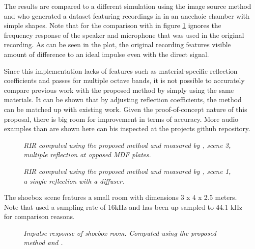 \documentclass[twoside,a4paper]{article}
\begin{document}
The results are compared to a different simulation using the image source method \cite{lehmann_fast_2020} and \cite{brinkmann_round_2019} who generated a dataset featuring recordings in in an anechoic chamber with simple shapes. Note that for the comparison with \cite{brinkmann_round_2019} in figure \ref{fig:multRefl} ignores the frequency response of the speaker and microphone that was used in the original recording. As can be seen in the plot, the original recording features visible amount of difference to an ideal impulse even with the direct signal. 

Since this implementation lacks of features such as material-specific reflection coefficients and passes for multiple octave bands, it is not possible to accurately compare previous work with the proposed method by simply using the same materials. It can be shown that by adjusting reflection coefficients, the method can be matched up with existing work.
Given the proof-of-concept nature of this proposal, there is big room for improvement in terms of accuracy. More audio examples than are shown here can bis inspected at the projects github repository.
\begin{figure}

    \begin{center}
      
    \end{center}
    
    \caption{\label{fig:multRefl} \it RIR computed using the proposed method and measured by \cite{brinkmann_round_2019}, scene 3, multiple reflection at opposed MDF plates.}
\end{figure}

\begin{figure}
    \begin{center}
      
    \end{center}
    
    \caption{\label{fig:diffuser} \it RIR computed using the proposed method and measured by \cite{brinkmann_round_2019}, scene 1, a single reflection with a diffuser.}
\end{figure}


The shoebox scene features a small room with dimensions 3 x 4 x 2.5 meters. Note that \cite{lehmann_fast_2020} used a sampling rate of 16kHz and has been up-sampled to 44.1 kHz for comparison reasons. 

\begin{figure}
    \begin{center}
      
    \end{center}
    \caption{\label{fig:shoe} \it Impulse response of shoebox room. Computed using the proposed method and \cite{lehmann_fast_2020}. }
    
\end{figure}
\end{document}
